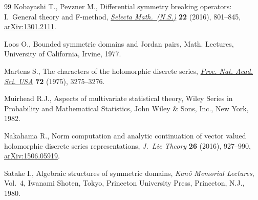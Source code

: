 \documentclass[11pt]{article}
\numberwithin{equation}{section}
\begin{document}
\begin{thebibliography}{99}
Kobayashi T., Pevzner M., Differential symmetry breaking operators:
 {I}.~{G}eneral theory and {F}-method, \href{https://doi.org/10.1007/s00029-015-0207-9}{\textit{Selecta Math.~(N.S.)}}
 \textbf{22} (2016), 801--845, \href{https://arxiv.org/abs/1301.2111}{arXiv:1301.2111}.

Loos O., Bounded symmetric domains and {J}ordan pairs, Math. Lectures,
 University of California, Irvine, 1977.

Martens S., The characters of the holomorphic discrete series, \href{https://doi.org/10.1073/pnas.72.9.3275}{\textit{Proc.
 Nat. Acad. Sci. USA}} \textbf{72} (1975), 3275--3276.

Muirhead R.J., Aspects of multivariate statistical theory, Wiley Series in
 Probability and Mathematical Statistics, John Wiley \& Sons, Inc., New York,
 1982.

Nakahama R., Norm computation and analytic continuation of vector valued
 holomorphic discrete series representations, \textit{J.~Lie Theory}
 \textbf{26} (2016), 927--990, \href{https://arxiv.org/abs/1506.05919}{arXiv:1506.05919}.

Satake I., Algebraic structures of symmetric domains, \textit{Kan\^{o} Memorial
 Lectures}, Vol.~4, Iwanami Shoten, Tokyo, Princeton University Press,
 Princeton, N.J., 1980.

\end{thebibliography}
\end{document}
